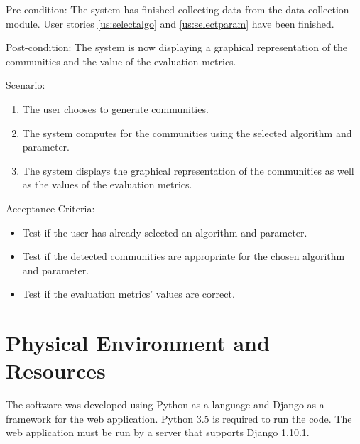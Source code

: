 Pre-condition: The system has finished collecting data from the data collection module. User stories \ref{us:selectalgo} and \ref{us:selectparam} have been finished.

Post-condition: The system is now displaying a graphical representation of the communities and the value of the evaluation
metrics.

Scenario:
\begin{enumerate}
	\item The user chooses to generate communities.
	\item The system computes for the communities using the selected algorithm and parameter.
	\item The system displays the graphical representation of the communities as well as the values of the evaluation metrics.
\end{enumerate}

Acceptance Criteria:
\begin{itemize}
	\item Test if the user has already selected an algorithm and parameter.
	\item Test if the detected communities are appropriate for the chosen algorithm and parameter.
	\item Test if the evaluation metrics' values are correct.
\end{itemize}

\section{Physical Environment and Resources}
The software was developed using Python as a language and Django as a framework for the web application. Python 3.5 is required to run the code. The web application must be run by a server that supports Django 1.10.1. 